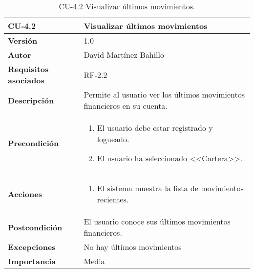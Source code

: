 \begin{table}[p]
	\centering
	\begin{tabularx}{\linewidth}{ p{} p{} }
		\toprule
		\textbf{CU-4.2}  & \textbf{Visualizar últimos movimientos}\\
		\midrule
		\textbf{Versión}              & 1.0    \\
		\textbf{Autor}                & David Martínez Bahillo \\
		\textbf{Requisitos asociados} & RF-2.2 \\
		\textbf{Descripción}          & Permite al usuario ver los últimos movimientos financieros en su cuenta. \\
		\textbf{Precondición}         &  
		\begin{enumerate}
			\def\labelenumi{\arabic{enumi}.}
			\tightlist
			\item El usuario debe estar registrado y logueado.
			\item El usuario ha seleccionado <<Cartera>>.
		\end{enumerate}\\
		\textbf{Acciones}             &
		\begin{enumerate}
			\def\labelenumi{\arabic{enumi}.}
			\tightlist
			\item El sistema muestra la lista de movimientos recientes.
		\end{enumerate}\\
		\textbf{Postcondición}        & El usuario conoce sus últimos movimientos financieros. \\
		\textbf{Excepciones}          & No hay últimos movimientos \\
		\textbf{Importancia}          & Media  \\
		\bottomrule
	\end{tabularx}
	\caption{CU-4.2 Visualizar últimos movimientos.}
\end{table}


